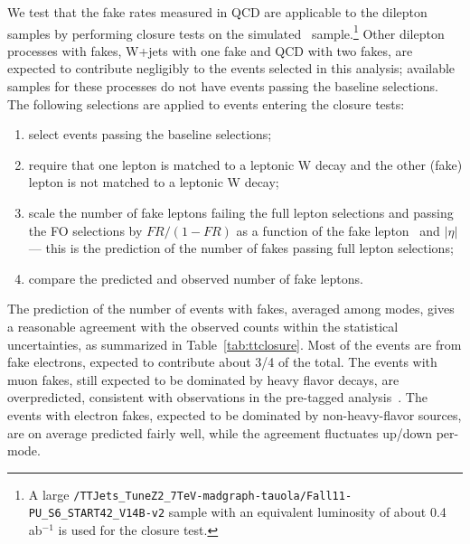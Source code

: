 We test that the fake rates measured in QCD are applicable to the dilepton samples by performing closure
tests on the simulated \ttbar\ sample.\footnote{A large {\tt /TTJets\_TuneZ2\_7TeV-madgraph-tauola/Fall11-PU\_S6\_START42\_V14B-v2} 
sample with an equivalent luminosity of about 0.4 ab$^{-1}$ is used for the closure test.}
Other dilepton processes with fakes, W+jets with one fake and QCD with two fakes, are expected
to contribute negligibly to the events selected in this analysis;
available samples for these processes do not have events passing the baseline selections.
The following selections are applied to events entering the closure tests:
\begin{enumerate}
\item select events passing the baseline selections;
\item require that one lepton is matched to a leptonic W decay and the other (fake) lepton is not
matched to a leptonic W decay;
\item scale the number of fake leptons failing the full lepton selections and passing the FO selections
	by $FR/(1-FR)$ as a function of the fake lepton \pt\ and $|\eta|$ --- this is the prediction
	of the number of fakes passing full lepton selections;
\item compare the predicted and observed number of fake leptons.
\end{enumerate}
The prediction of the number of events with fakes,
averaged among modes, gives a reasonable agreement with the observed counts
within the statistical uncertainties, as summarized in Table~\ref{tab:ttclosure}.
Most of the events are from fake electrons, expected to contribute about 3/4 of the total.
The events with muon fakes, still expected to be dominated by heavy flavor decays,
are overpredicted, consistent with observations in the pre-tagged analysis~\cite{ssnote2011}.
The events with electron fakes, expected to be dominated by non-heavy-flavor sources,
are on average predicted fairly well, while the agreement fluctuates up/down per-mode.

